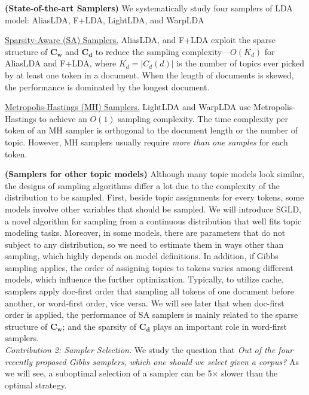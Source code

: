 \documentclass[10pt,journal,cspaper,compsoc]{IEEEtran}
\begin{document}
\vspace{0.5em}
{\bf (State-of-the-art Samplers)} We systematically
study four samplers of LDA model: AliasLDA, F+LDA,
LightLDA, and WarpLDA~\cite{chen2016warplda,yuan2015lightlda,li2014reducing,yu2015scalable}

\underline{Sparsity-Aware (SA) Samplers.}
AliasLDA, and F+LDA exploit the sparse structure of
$\mathbf{C_w}$ and $\mathbf{C_d}$ to reduce the sampling
complexity---$O(K_d)$ for AliasLDA
and F+LDA, where $K_d = |C_d(d)|$ is the
number of topics ever picked by at least one token
in a document.
When the length of documents is skewed, the performance
is dominated by the longest document.

\underline{Metropolis-Hastings (MH) Samplers.}
LightLDA and WarpLDA use Metropolis-Hastings to
achieve an $O(1)$ sampling complexity. The time complexity
per token of an MH sampler
is orthogonal to the document length or the number of
topic. However, MH samplers
usually require {\em more than one samples} for each token.

\vspace{0.5em}
{\bf (Samplers for other topic models)} Although many
topic models look similar, the designs of sampling 
algorithms differ a lot due to the complexity of
the distribution to be sampled. First, beside topic assignments for every tokens, some models involve other variables that should be sampled. We will introduce SGLD, a novel algorithm for sampling from a continuous distribution that well fits topic modeling tasks. Moreover, in some models, there are parameters that do not subject to any distribution, so we need to estimate them in ways other than sampling, which highly depends on model definitions. In addition, if Gibbs sampling applies, the order of assigning topics to tokens varies among different models, which influence the further optimization.
Typically, to utilize cache, samplers apply doc-first
order that sampling all tokens of one document before another, or word-first order, vice versa. 
We will see later that when doc-first order is applied, the performance of SA samplers is mainly related to the sparse structure of $\mathbf{C_w}$; and the sparsity of $\mathbf{C_d}$ plays an important role in word-first samplers.
\\

\noindent
{\large \em Contribution 2: Sampler Selection.}
We study the question that {\em Out of the four recently proposed Gibbs samplers, which one 
should we select given a corpus?} 
As we will see, a suboptimal selection of a sampler can be 5$\times$ slower than the optimal strategy.
\end{document}
